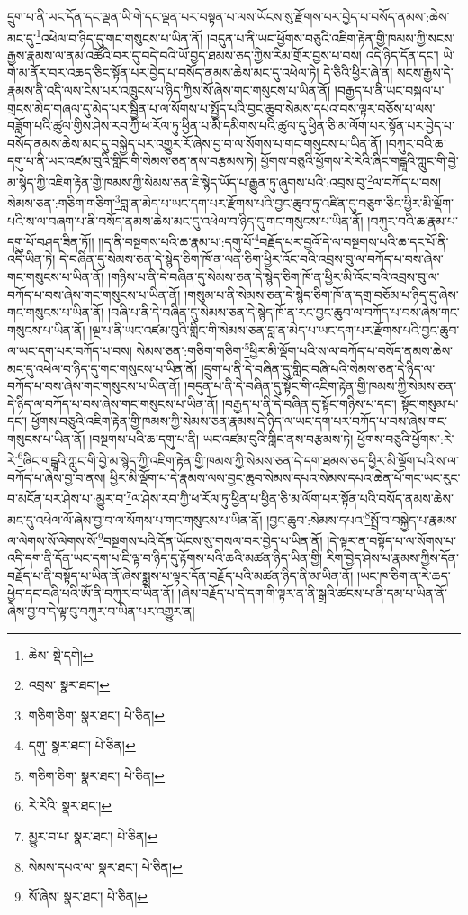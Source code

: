 དྲུག་པ་ནི་ཡང་དོན་དང་ལྡན་ཡི་གེ་དང་ལྡན་པར་བསྟན་པ་ལས་ཡོངས་སུ་རྫོགས་པར་བྱེད་པ་བསོད་ནམས་:ཆེས་མང་དུ་\footnote{ཆེས་  སྡེ་དགེ། }འཕེལ་བ་ཉིད་དུ་གང་གསུངས་པ་ཡིན་ནོ། །བདུན་པ་ནི་ཡང་ཕྱོགས་བཅུའི་འཇིག་རྟེན་གྱི་ཁམས་ཀྱི་སངས་རྒྱས་རྣམས་ལ་ནམ་འཚོའི་བར་དུ་བདེ་བའི་ཡོ་བྱད་ཐམས་ཅད་ཀྱིས་རིམ་གྲོར་བྱས་པ་བས། འདི་ཉིད་དོན་དང་། ཡི་གེ་མ་ནོར་བར་འཆད་ཅིང་སྟོན་པར་བྱེད་པ་བསོད་ནམས་ཆེས་མང་དུ་འཕེལ་ཏེ། དེ་ཅིའི་ཕྱིར་ཞེ་ན། སངས་རྒྱས་དེ་རྣམས་ནི་འདི་ལས་ངེས་པར་འཁྲུངས་པ་ཉིད་ཀྱིས་སོ་ཞེས་གང་གསུངས་པ་ཡིན་ནོ། །བརྒྱད་པ་ནི་ཡང་བསྐལ་པ་གྲངས་མེད་གཞལ་དུ་མེད་པར་སྦྱིན་པ་ལ་སོགས་པ་སྤྱོད་པའི་བྱང་ཆུབ་སེམས་དཔའ་བས་ལྟར་བཅོས་པ་ལས་བཟློག་པའི་ཚུལ་གྱིས་ཤེས་རབ་ཀྱི་ཕ་རོལ་ཏུ་ཕྱིན་པ་མི་དམིགས་པའི་ཚུལ་དུ་ཕྱིན་ཅི་མ་ལོག་པར་སྟོན་པར་བྱེད་པ་བསོད་ནམས་ཆེས་མང་དུ་བསྐྱེད་པར་འགྱུར་རོ་ཞེས་བྱ་བ་ལ་སོགས་པ་གང་གསུངས་པ་ཡིན་ནོ། །བཀུར་བའི་ཆ་དགུ་པ་ནི་ཡང་འཛམ་བུའི་གླིང་གི་སེམས་ཅན་ནས་བརྩམས་ཏེ། ཕྱོགས་བཅུའི་ཕྱོགས་རེ་རེའི་ཞིང་གངྒཱའི་ཀླུང་གི་བྱེ་མ་སྙེད་ཀྱི་འཇིག་རྟེན་གྱི་ཁམས་ཀྱི་སེམས་ཅན་ཇི་སྙེད་ཡོད་པ་རྒྱུན་ཏུ་ཞུགས་པའི་:འབྲས་བུ་\footnote{འབྲས་  སྣར་ཐང་། }ལ་བཀོད་པ་བས། སེམས་ཅན་:གཅིག་གཅིག་\footnote{གཅིག་ཅིག་  སྣར་ཐང་།  པེ་ཅིན། }བླ་ན་མེད་པ་ཡང་དག་པར་རྫོགས་པའི་བྱང་ཆུབ་ཏུ་འཛིན་དུ་བཅུག་ཅིང་ཕྱིར་མི་ལྡོག་པའི་ས་ལ་བཞག་པ་ནི་བསོད་ནམས་ཆེས་མང་དུ་འཕེལ་བ་ཉིད་དུ་གང་གསུངས་པ་ཡིན་ནོ། །བཀུར་བའི་ཆ་རྣམ་པ་དགུ་པོ་བཤད་ཟིན་ཏོ།། །།ད་ནི་བསྔགས་པའི་ཆ་རྣམ་པ་:དགུ་པོ་\footnote{དགུ་  སྣར་ཐང་།  པེ་ཅིན། }བརྗོད་པར་བྱའོ་དེ་ལ་བསྔགས་པའི་ཆ་དང་པོ་ནི་འདི་ཡིན་ཏེ། དེ་བཞིན་དུ་སེམས་ཅན་དེ་སྙེད་ཅིག་ཁོ་ན་ལན་ཅིག་ཕྱིར་འོང་བའི་འབྲས་བུ་ལ་བཀོད་པ་བས་ཞེས་གང་གསུངས་པ་ཡིན་ནོ། །གཉིས་པ་ནི་དེ་བཞིན་དུ་སེམས་ཅན་དེ་སྙེད་ཅིག་ཁོ་ན་ཕྱིར་མི་འོང་བའི་འབྲས་བུ་ལ་བཀོད་པ་བས་ཞེས་གང་གསུངས་པ་ཡིན་ནོ། །གསུམ་པ་ནི་སེམས་ཅན་དེ་སྙེད་ཅིག་ཁོ་ན་དགྲ་བཅོམ་པ་ཉིད་དུ་ཞེས་གང་གསུངས་པ་ཡིན་ནོ། །བཞི་པ་ནི་དེ་བཞིན་དུ་སེམས་ཅན་དེ་སྙེད་ཁོ་ན་རང་བྱང་ཆུབ་ལ་བཀོད་པ་བས་ཞེས་གང་གསུངས་པ་ཡིན་ནོ། །ལྔ་པ་ནི་ཡང་འཛམ་བུའི་གླིང་གི་སེམས་ཅན་བླ་ན་མེད་པ་ཡང་དག་པར་རྫོགས་པའི་བྱང་ཆུབ་ལ་ཡང་དག་པར་བཀོད་པ་བས། སེམས་ཅན་:གཅིག་གཅིག་\footnote{གཅིག་ཅིག་  སྣར་ཐང་།  པེ་ཅིན། }ཕྱིར་མི་ལྡོག་པའི་ས་ལ་བཀོད་པ་བསོད་ནམས་ཆེས་མང་དུ་འཕེལ་བ་ཉིད་དུ་གང་གསུངས་པ་ཡིན་ནོ། །དྲུག་པ་ནི་དེ་བཞིན་དུ་གླིང་བཞི་པའི་སེམས་ཅན་དེ་ཉིད་ལ་བཀོད་པ་བས་ཞེས་གང་གསུངས་པ་ཡིན་ནོ། །བདུན་པ་ནི་དེ་བཞིན་དུ་སྟོང་གི་འཇིག་རྟེན་གྱི་ཁམས་ཀྱི་སེམས་ཅན་དེ་ཉིད་ལ་བཀོད་པ་བས་ཞེས་གང་གསུངས་པ་ཡིན་ནོ། །བརྒྱད་པ་ནི་དེ་བཞིན་དུ་སྟོང་གཉིས་པ་དང་། སྟོང་གསུམ་པ་དང་། ཕྱོགས་བཅུའི་འཇིག་རྟེན་གྱི་ཁམས་ཀྱི་སེམས་ཅན་རྣམས་དེ་ཉིད་ལ་ཡང་དག་པར་བཀོད་པ་བས་ཞེས་གང་གསུངས་པ་ཡིན་ནོ། །བསྔགས་པའི་ཆ་དགུ་པ་ནི། ཡང་འཛམ་བུའི་གླིང་ནས་བརྩམས་ཏེ། ཕྱོགས་བཅུའི་ཕྱོགས་:རེ་རེ་\footnote{རེ་རེའི་  སྣར་ཐང་། }ཞིང་གངྒཱའི་ཀླུང་གི་བྱེ་མ་སྙེད་ཀྱི་འཇིག་རྟེན་གྱི་ཁམས་ཀྱི་སེམས་ཅན་དེ་དག་ཐམས་ཅད་ཕྱིར་མི་ལྡོག་པའི་ས་ལ་བཀོད་པ་ཞེས་བྱ་བ་ནས། ཕྱིར་མི་ལྡོག་པ་དེ་རྣམས་ལས་བྱང་ཆུབ་སེམས་དཔའ་སེམས་དཔའ་ཆེན་པོ་གང་ཡང་རུང་བ་མངོན་པར་ཤེས་པ་:མྱུར་བ་\footnote{མྱུར་བ་པ་  སྣར་ཐང་།  པེ་ཅིན། }ལ་ཤེས་རབ་ཀྱི་ཕ་རོལ་ཏུ་ཕྱིན་པ་ཕྱིན་ཅི་མ་ལོག་པར་སྟོན་པའི་བསོད་ནམས་ཆེས་མང་དུ་འཕེལ་ལོ་ཞེས་བྱ་བ་ལ་སོགས་པ་གང་གསུངས་པ་ཡིན་ནོ། །བྱང་ཆུབ་:སེམས་དཔའ་\footnote{སེམས་དཔའ་ལ་  སྣར་ཐང་།  པེ་ཅིན། }སྤྲོ་བ་བསྐྱེད་པ་རྣམས་ལ་ལེགས་སོ་ལེགས་སོ་\footnote{སོ་ཞེས་  སྣར་ཐང་།  པེ་ཅིན། }བསྔགས་པའི་དོན་ཡོངས་སུ་གསལ་བར་བྱེད་པ་ཡིན་ནོ། །དེ་ལྟར་ན་བསྟོད་པ་ལ་སོགས་པ་འདི་དག་ནི་དོན་ཡང་དག་པ་ཇི་ལྟ་བ་ཉིད་དུ་རྟོགས་པའི་ཆའི་མཚན་ཉིད་ཡིན་གྱི། རིག་བྱེད་ཤེས་པ་རྣམས་ཀྱིས་དོན་བརྗོད་པ་ནི་བསྟོད་པ་ཡིན་ནོ་ཞེས་སྨྲས་པ་ལྟར་དོན་བརྗོད་པའི་མཚན་ཉིད་ནི་མ་ཡིན་ནོ། །ཡང་ཁ་ཅིག་ན་རེ་ཆད་ཕྱེད་དང་བཞི་པའི་ཨོཾ་ནི་བཀུར་བ་ཡིན་ནོ། །ཞེས་བརྗོད་པ་དེ་དག་གི་ལྟར་ན་ནི་སྒྲའི་ཚངས་པ་ནི་དམ་པ་ཡིན་ནོ་ཞེས་བྱ་བ་དེ་ལྟ་བུ་བཀུར་བ་ཡིན་པར་འགྱུར་ན། 